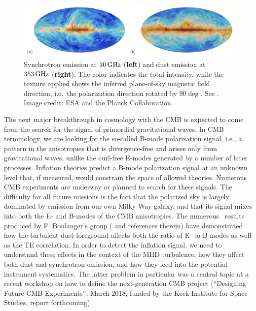 \begin{figure}[]
\includegraphics[width=\columnwidth]{maps_lowres.png}
 \caption{Synchrotron emission at $30\,{\rm GHz}$ ({\bf left}) and dust emission at $353\,{\rm GHz}$ ({\bf right}).
The color indicates the total intensity, while the texture applied shows the inferred plane-of-sky magnetic field direction, i.e.\ the polarization direction rotated by $90
\deg$.
See \citet{planck15_I}. Image credit: ESA and the Planck Collaboration.}
\label{fig:planck}
\end{figure}


The next major breakthrough in cosmology with the CMB is expected to come from the search for the signal of primordial gravitational waves. In CMB terminology, we are looking for the so-called B-mode polarization signal, i.e., a pattern in the anisotropies that is divergence-free and arises only from gravitational waves, unlike the curl-free E-modes generated by a number of later processes. Inflation theories predict a B-mode polarization signal at an unknown level that, if measured, would constrain the space of allowed theories. Numerous CMB experiments are underway or planned to search for these signals. 
The difficulty for all future missions is the fact that the polarized sky is largely dominated by emission from our own Milky Way galaxy, and that its signal mixes into both the E- and B-modes of the CMB anisotropies. The numerous \planck\ results produced by F. Boulanger's group (\citealt{pipLIV} and references therein)  have demonstrated how the turbulent dust foreground affects both the ratio of E- to B-modes as well as the TE correlation.  In order to detect the inflation signal, we need to understand these effects in the context of the MHD turbulence, how they affect both dust and synchrotron emission, and how they feed into the potential instrument systematics. The latter problem in particular was a central topic at a recent workshop on how to define the next-generation CMB project (``Designing Future CMB Experiments'', March 2018, funded by the Keck Institute for Space Studies, report forthcoming). 

